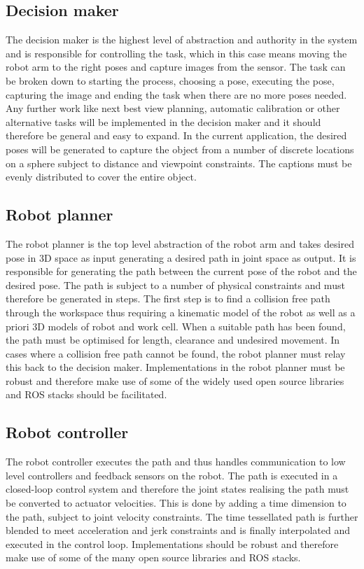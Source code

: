\subsection{Decision maker}
The decision maker is the highest level of abstraction and authority in the system and is responsible for controlling the task, which in this case means moving the robot arm to the right poses and capture images from the sensor. The task can be broken down to starting the process, choosing a pose, executing the pose, capturing the image and ending the task when there are no more poses needed. Any further work like next best view planning, automatic calibration or other alternative tasks will be implemented in the decision maker and it should therefore be general and easy to expand. In the current application, the desired poses will be generated to capture the object from a number of discrete locations on a sphere subject to distance and viewpoint constraints. The captions must be evenly distributed to cover the entire object. 



\subsection{Robot planner}
The robot planner is the top level abstraction of the robot arm and takes desired pose in 3D space as input generating a desired path in joint space as output. It is responsible for generating the path between the current pose of the robot and the desired pose. The path is subject to a number of physical constraints and must therefore be generated in steps. The first step is to find a collision free path through the workspace thus requiring a kinematic model of the robot as well as a priori 3D models of robot and work cell. When a suitable path has been found, the path must be optimised for length, clearance and undesired movement. In cases where a collision free path cannot be found, the robot planner must relay this back to the decision maker. Implementations in the robot planner must be robust and therefore make use of some of the widely used open source libraries and ROS stacks should be facilitated. 

\subsection{Robot controller}
The robot controller executes the path and thus handles communication to low level controllers and feedback sensors on the robot. The path is executed in a closed-loop control system and therefore the joint states realising the path must be converted to actuator velocities. This is done by adding a time dimension to the path, subject to joint velocity constraints. The time tessellated path is further blended to meet acceleration and jerk constraints and is finally interpolated and executed in the control loop. Implementations should be robust and therefore make use of some of the many open source libraries and ROS stacks. 

